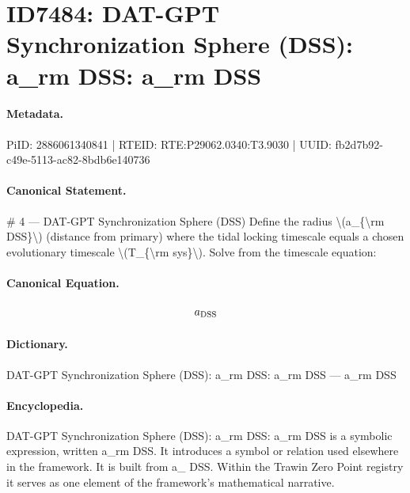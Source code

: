 \section*{ID7484: DAT-GPT Synchronization Sphere (DSS): a\_rm DSS: a\_rm DSS}
\paragraph{Metadata.}
PiID: 2886061340841 | RTEID: RTE:P29062.0340:T3.9030 | UUID: fb2d7b92-c49e-5113-ac82-8bdb6e140736

\paragraph{Canonical Statement.}
\# 4 — DAT-GPT Synchronization Sphere (DSS) Define the radius \textbackslash{}(a\_\{\textbackslash{}rm DSS\}\textbackslash{}) (distance from primary) where the tidal locking timescale equals a chosen evolutionary timescale \textbackslash{}(T\_\{\textbackslash{}rm sys\}\textbackslash{}). Solve from the timescale equation:

\paragraph{Canonical Equation.}
\[
a_{\rm DSS}
\]

\paragraph{Dictionary.}
DAT-GPT Synchronization Sphere (DSS): a\_rm DSS: a\_rm DSS — a\_rm DSS

\paragraph{Encyclopedia.}
DAT-GPT Synchronization Sphere (DSS): a\_rm DSS: a\_rm DSS is a symbolic expression, written a\_rm DSS. It introduces a symbol or relation used elsewhere in the framework. It is built from a\_ DSS. Within the Trawin Zero Point registry it serves as one element of the framework's mathematical narrative.
